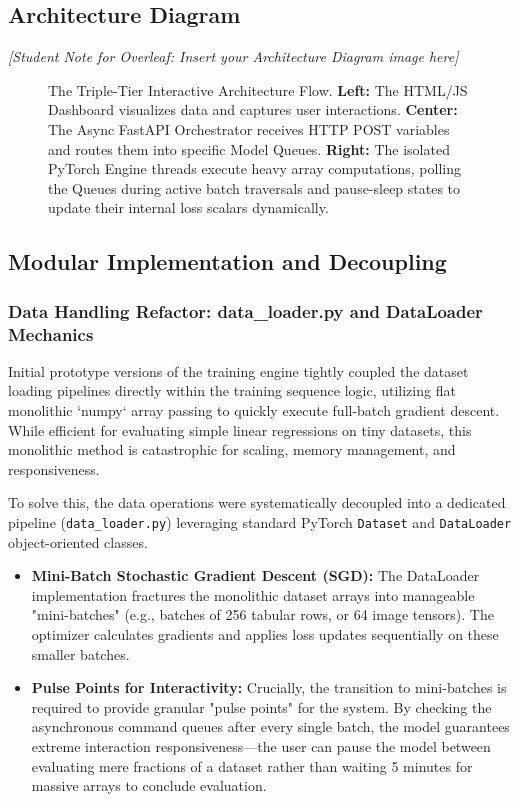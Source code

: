\documentclass[12pt,a4paper]{article}
\begin{document}
\subsection{Architecture Diagram}

\textit{[Student Note for Overleaf: Insert your Architecture Diagram image here]}
\begin{figure}[h]
    \centering
    \caption{The Triple-Tier Interactive Architecture Flow. \textbf{Left:} The HTML/JS Dashboard visualizes data and captures user interactions. \textbf{Center:} The Async FastAPI Orchestrator receives HTTP POST variables and routes them into specific Model Queues. \textbf{Right:} The isolated PyTorch Engine threads execute heavy array computations, polling the Queues during active batch traversals and pause-sleep states to update their internal loss scalars dynamically.}
    \label{fig:triple_tier_architecture}
\end{figure}

\subsection{Modular Implementation and Decoupling}

\subsubsection{Data Handling Refactor: data\_loader.py and DataLoader Mechanics}
Initial prototype versions of the training engine tightly coupled the dataset loading pipelines directly within the training sequence logic, utilizing flat monolithic `numpy` array passing to quickly execute full-batch gradient descent. While efficient for evaluating simple linear regressions on tiny datasets, this monolithic method is catastrophic for scaling, memory management, and responsiveness. 

To solve this, the data operations were systematically decoupled into a dedicated pipeline (\texttt{data\_loader.py}) leveraging standard PyTorch \texttt{Dataset} and \texttt{DataLoader} object-oriented classes. 
\begin{itemize}
    \item \textbf{Mini-Batch Stochastic Gradient Descent (SGD):} The DataLoader implementation fractures the monolithic dataset arrays into manageable "mini-batches" (e.g., batches of 256 tabular rows, or 64 image tensors). The optimizer calculates gradients and applies loss updates sequentially on these smaller batches.
    \item \textbf{Pulse Points for Interactivity:} Crucially, the transition to mini-batches is required to provide granular "pulse points" for the system. By checking the asynchronous command queues after every single batch, the model guarantees extreme interaction responsiveness—the user can pause the model between evaluating mere fractions of a dataset rather than waiting 5 minutes for massive arrays to conclude evaluation.
\end{itemize}
\end{document}
